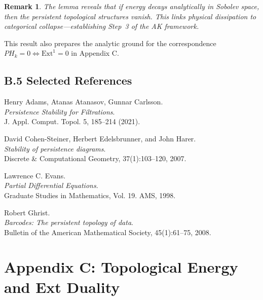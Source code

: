 \documentclass[11pt]{article}
\newtheorem{remark}[theorem]{Remark}
\begin{document}
\begin{remark}
The lemma reveals that if energy decays analytically in Sobolev space, then the persistent topological structures vanish. This links physical dissipation to categorical collapse—establishing Step~3 of the AK framework.
\end{remark}

\begin{note}
This result also prepares the analytic ground for the correspondence $PH_k = 0 \Leftrightarrow \mathrm{Ext}^1 = 0$ in Appendix C.
\end{note}

\subsection*{B.5 Selected References}

\begin{thebibliography}{9}

Henry Adams, Atanas Atanasov, Gunnar Carlsson.\\
\textit{Persistence Stability for Filtrations}.\\
J. Appl. Comput. Topol. 5, 185–214 (2021).

David Cohen-Steiner, Herbert Edelsbrunner, and John Harer.\\
\textit{Stability of persistence diagrams}.\\
Discrete \& Computational Geometry, 37(1):103--120, 2007.

Lawrence C. Evans.\\
\textit{Partial Differential Equations}.\\
Graduate Studies in Mathematics, Vol. 19. AMS, 1998.

Robert Ghrist.\\
\textit{Barcodes: The persistent topology of data}.\\
Bulletin of the American Mathematical Society, 45(1):61--75, 2008.

\end{thebibliography}



\section*{Appendix C: Topological Energy and Ext Duality}
\end{document}
